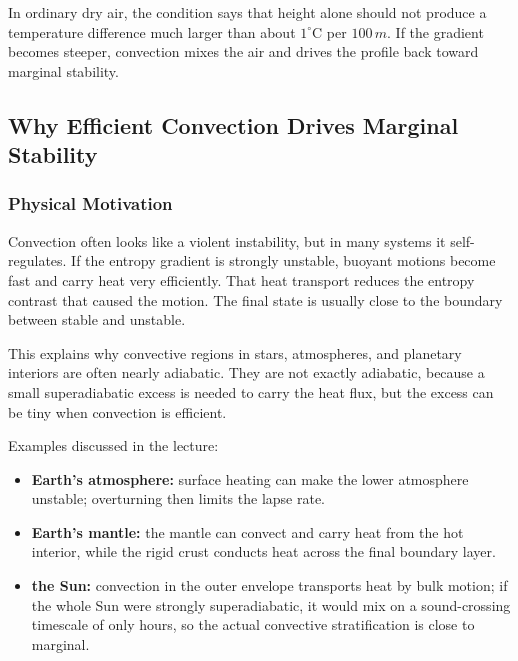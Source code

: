 In ordinary dry air, the condition says that height alone should not produce a
temperature difference much larger than about $1^\circ\mathrm{C}$ per
$100\,\si{m}$. If the gradient becomes steeper, convection mixes the air and
drives the profile back toward marginal stability.

\subsection{Why Efficient Convection Drives Marginal Stability}
\label{sec:lec07:marginal-stability}

\subsubsection*{Physical Motivation}
Convection often looks like a violent instability, but in many systems it
self-regulates. If the entropy gradient is strongly unstable, buoyant motions
become fast and carry heat very efficiently. That heat transport reduces the
entropy contrast that caused the motion. The final state is usually close to
the boundary between stable and unstable.

This explains why convective regions in stars, atmospheres, and planetary
interiors are often nearly adiabatic. They are not exactly adiabatic, because
a small superadiabatic excess is needed to carry the heat flux, but the excess
can be tiny when convection is efficient.

Examples discussed in the lecture:
\begin{itemize}
    \item \textbf{Earth's atmosphere:} surface heating can make the lower
    atmosphere unstable; overturning then limits the lapse rate.
    \item \textbf{Earth's mantle:} the mantle can convect and carry heat from
    the hot interior, while the rigid crust conducts heat across the final
    boundary layer.
    \item \textbf{the Sun:} convection in the outer envelope transports heat
    by bulk motion; if the whole Sun were strongly superadiabatic, it would
    mix on a sound-crossing timescale of only hours, so the actual convective
    stratification is close to marginal.
\end{itemize}

